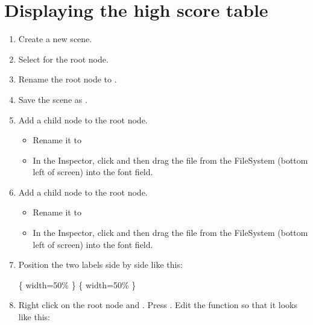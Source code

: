 \documentclass[letterpaper,10pt,english]{sphinxmanual}
\begin{document}
\section{Displaying the high score table}
\label{\detokenize{pandoc_tut:displaying-the-high-score-table}}\begin{enumerate}
%
\item {} 
\sphinxAtStartPar
Create a new scene.

\item {} 
\sphinxAtStartPar
Select  for  the root node.

\item {} 
\sphinxAtStartPar
Rename the root node to .

\item {} 
\sphinxAtStartPar
Save the scene as .

\item {} 
\sphinxAtStartPar
Add a  child node to the root node.
\begin{itemize}
\item {} 
\sphinxAtStartPar
Rename it to 

\item {} 
\sphinxAtStartPar
In the Inspector, click  and then drag the  file from the
FileSystem (bottom left of screen) into the \sphinxstylestrong{{[}empty{]}}
font field.

\end{itemize}

\item {} 
\sphinxAtStartPar
Add a  child node to the root node.
\begin{itemize}
\item {} 
\sphinxAtStartPar
Rename it to 

\item {} 
\sphinxAtStartPar
In the Inspector, click  and then drag the  file from the
FileSystem (bottom left of screen) into the \sphinxstylestrong{{[}empty{]}}
font field.

\end{itemize}

\item {} 
\sphinxAtStartPar
Position the two labels side by side like this:

\sphinxAtStartPar
{}\{ width=50\% \}
\{ width=50\% \}

\item {} 
\sphinxAtStartPar
Right click on the root node and .  Press .  Edit the  function
so that it looks like this:

\end{enumerate}
\end{document}
